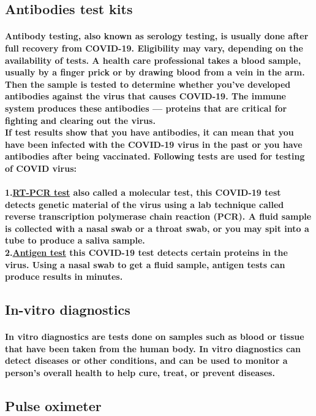 \documentclass{article}
\begin{document}
	\subsection{\textbf{Antibodies test kits}}
	\paragraph{Antibody testing, also known as serology testing, is usually done after full recovery from COVID-19. Eligibility may vary, depending on the availability of tests. A health care professional takes a blood sample, usually by a finger prick or by drawing blood from a vein in the arm. Then the sample is tested to determine whether you've developed antibodies against the virus that causes COVID-19. The immune system produces these antibodies — proteins that are critical for fighting and clearing out the virus.\\
	If test results show that you have antibodies, it can mean that you have been infected with the COVID-19 virus in the past or you have antibodies after being vaccinated. Following tests are used for testing of COVID virus:
	\\\\ 1.\underline{RT-PCR test} also called a molecular test, this COVID-19 test detects genetic material of the virus using a lab technique called reverse transcription polymerase chain reaction (PCR). A fluid sample is collected with a nasal swab or a throat swab, or you may spit into a tube to produce a saliva sample.
	\\ 2.\underline{Antigen test} this COVID-19 test detects certain proteins in the virus. Using a nasal swab to get a fluid sample, antigen tests can produce results in minutes.}
	\subsection{\textbf{In-vitro diagnostics}}
	\paragraph{In vitro diagnostics are tests done on samples such as blood or tissue that have been taken from the human body. In vitro diagnostics can detect diseases or other conditions, and can be used to monitor a person’s overall health to help cure, treat, or prevent diseases.}
	\subsection{\textbf{Pulse oximeter}}
\end{document}
